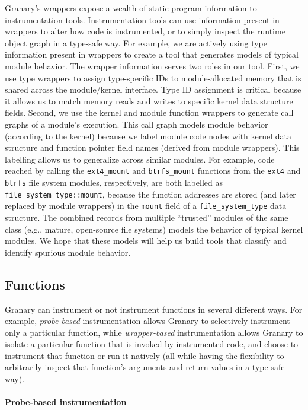 \documentclass[preprint]{sigplanconf}
\begin{document}
Granary's wrappers expose a wealth of static program information to instrumentation tools. Instrumentation tools can use information present in wrappers to alter how code is instrumented, or to simply inspect the runtime object graph in a type-safe way. For example, we are actively using type information present in wrappers to create a tool that generates models of typical module behavior. The wrapper information serves two roles in our tool. First, we use type wrappers to assign type-specific IDs to module-allocated memory that is shared across the module/kernel interface. Type ID assignment is critical because it allows us to match memory reads and writes to specific kernel data structure fields. Second, we use the kernel and module function wrappers to generate call graphs of a module's execution. This call graph models module behavior (according to the kernel) because we label module code nodes with kernel data structure and function pointer field names (derived from module wrappers). This labelling allows us to generalize across similar modules. For example, code reached by calling the \texttt{ext4\_mount} and \texttt{btrfs\_mount} functions from the \texttt{ext4} and \texttt{btrfs} file system modules, respectively, are both labelled as \texttt{file\_system\_type::mount}, because the function addresses are stored (and later replaced by module wrappers) in the \texttt{mount} field of a \texttt{file\_system\_type} data structure. The combined records from multiple ``trusted'' modules of the same class (e.g., mature, open-source file systems) models the behavior of typical kernel modules. We hope that these models will help us build tools that classify and identify spurious module behavior. 

\subsection{Functions}

Granary can instrument or not instrument functions in several different ways. For example, \emph{probe-based} instrumentation allows Granary to selectively instrument only a particular function, while \emph{wrapper-based} instrumentation allows Granary to isolate a particular function that is invoked by instrumented code, and choose to instrument that function or run it natively (all while having the flexibility to arbitrarily inspect that function's arguments and return values in a type-safe way).

\paragraph{Probe-based instrumentation}
\end{document}
